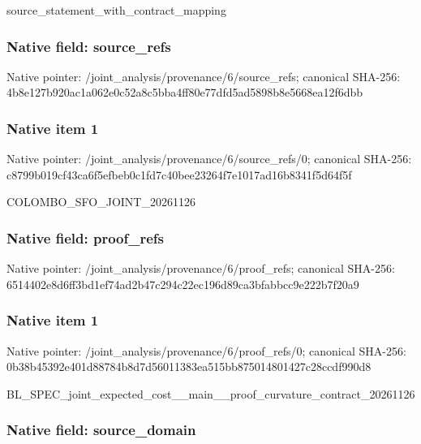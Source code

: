\documentclass[10pt,a4paper]{article}
\begin{document}
source\_statement\_with\_contract\_mapping


\subsubsection{Native field: source\_refs}


Native pointer: /joint\_analysis/provenan\allowbreak{}ce/6/source\_refs; canonical SHA-256: 4b8e127b920ac1a062e0c52a\allowbreak{}8c5bba4ff80e77dfd5ad5898\allowbreak{}b8e5668ea12f6dbb



\subsubsection{Native item 1}


Native pointer: /joint\_analysis/provenan\allowbreak{}ce/6/source\_refs/0; canonical SHA-256: c8799b019cf43ca6f5efbeb0\allowbreak{}c1fd7c40bee23264f7e1017a\allowbreak{}d16b8341f5d64f5f


COLOMBO\_SFO\_JOINT\_20261126


\subsubsection{Native field: proof\_refs}


Native pointer: /joint\_analysis/provenance/6/proof\_refs; canonical SHA-256: 6514402e8d6ff3bd1ef74ad2\allowbreak{}b47c294c22ec196d89ca3bfa\allowbreak{}bbcc9e222b7f20a9



\subsubsection{Native item 1}


Native pointer: /joint\_analysis/provenan\allowbreak{}ce/6/proof\_refs/0; canonical SHA-256: 0b38b45392e401d88784b8d7\allowbreak{}d56011383ea515bb87501480\allowbreak{}1427c28ccdf990d8


BL\_SPEC\_joint\_expected\_c\allowbreak{}ost\_\_main\_\_proof\_curvatu\allowbreak{}re\_contract\_20261126


\subsubsection{Native field: source\_domain}
\end{document}
